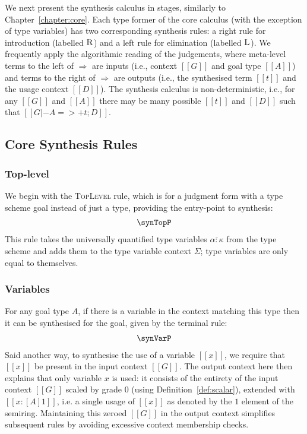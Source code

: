 We next present the synthesis calculus in stages, similarly to
Chapter~\ref{chapter:core}. Each type former of the core calculus (with the
exception of type variables) has two corresponding synthesis rules: a right rule
for introduction (labelled $\textsc{R}$) and a left rule for elimination
(labelled $\textsc{L}$). We frequently apply the algorithmic reading of the
judgements, where meta-level terms to the left of $\Rightarrow$ are inputs
(i.e., context $[[ G ]]$ and goal type $[[ A ]]$) and terms to the right of
$\Rightarrow$ are outputs (i.e., the synthesised term $[[ t ]]$ and the usage
context $[[ D ]]$).
%
The synthesis calculus is non-deterministic, i.e., for any $[[ G ]]$
and $[[ A ]]$ there may be many possible $[[ t ]]$ and $[[ D ]]$ such
that $[[ G |- A =>+ t ; D ]]$. 

\subsection{Core Synthesis Rules}
\label{subsection:rules}
\subsubsection{Top-level}
We begin with the \textsc{TopLevel} rule, which is
for a judgment form with a type scheme goal instead of just a
type, providing the entry-point to synthesis:
\begin{align*}
  \synTopP
\end{align*}
This rule takes the universally quantified type variables $\overline{\alpha : \kappa}$
from the type scheme and adds them to the type variable context $\Sigma$;
type variables are only equal to themselves.

\subsubsection{Variables}
For any goal type $A$, if there is a variable in the context matching this type
then it can be synthesised for the goal, given by the terminal rule:
%
\begin{align*}
  \synVarP
\end{align*}
%
Said another way, to synthesise the use of a variable $[[ x ]]$, we require that $[[ x ]]$ be
present in the input context $[[ G ]]$. The output context here then explains
that only variable $x$ is used: it consists of the
entirety of the input context $[[ G ]]$ scaled by grade $0$ (using
Definition~\ref{def:scalar}), extended with $[[x : [A] 1]]$, i.e. a single usage
of $[[ x ]]$ as denoted by the $1$ element of the semiring.
Maintaining this zeroed $[[ G ]]$ in the output context simplifies
subsequent rules by avoiding excessive context membership checks.

